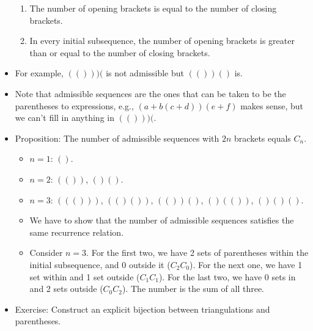 \documentclass[../main.tex]{subfiles}
\begin{document}
\begin{itemize}
\begin{enumerate}
        \item The number of opening brackets is equal to the number of closing brackets.
        \item In every initial subsequence, the number of opening brackets is greater than or equal to the number of closing brackets.
    \end{enumerate}
    \item For example, $(()))($ is not admissible but $(())()$ is.
    \item Note that admissible sequences are the ones that can be taken to be the parentheses to expressions, e.g., $(a+b(c+d))(e+f)$ makes sense, but we can't fill in anything in $(()))($.
    \item Proposition: The number of admissible sequences with $2n$ brackets equals $C_n$.
    \begin{itemize}
        \item $n=1$: $()$.
        \item $n=2$: $(())$, $()()$.
        \item $n=3$: $((()))$, $(()())$, $(())()$, $()(())$, $()()()$.
        \item We have to show that the number of admissible sequences satisfies the same recurrence relation.
        \item Consider $n=3$. For the first two, we have 2 sets of parentheses within the initial subsequence, and 0 outside it ($C_2C_0$). For the next one, we have 1 set within and 1 set outside ($C_1C_1$). For the last two, we have 0 sets in and 2 sets outside ($C_0C_2$). The number is the sum of all three.
    \end{itemize}
    \item Exercise: Construct an explicit bijection between triangulations and parentheses.
\end{itemize}
\end{document}
